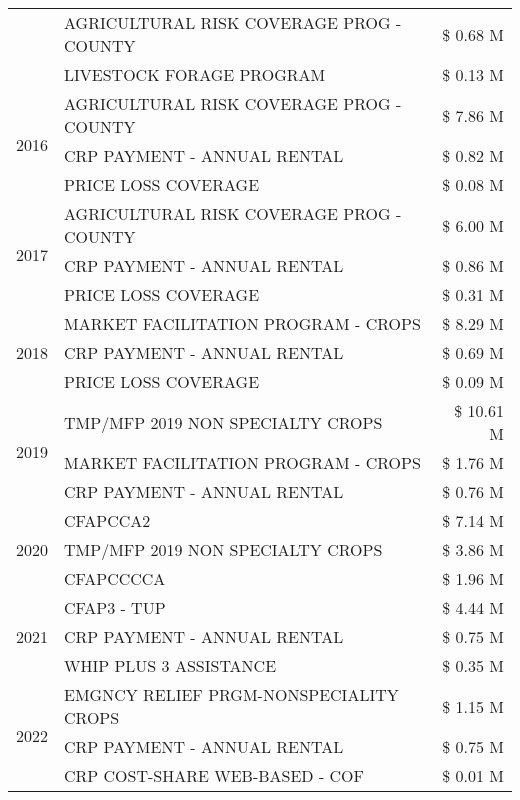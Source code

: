 \begin{tabular}{llr}
 & AGRICULTURAL RISK COVERAGE PROG - COUNTY & \$ 0.68 M \\
 & LIVESTOCK FORAGE PROGRAM & \$ 0.13 M \\
\cline{1-3}
\multirow[t]{3}{*}{2016} & AGRICULTURAL RISK COVERAGE PROG - COUNTY & \$ 7.86 M \\
 & CRP PAYMENT - ANNUAL RENTAL & \$ 0.82 M \\
 & PRICE LOSS COVERAGE & \$ 0.08 M \\
\cline{1-3}
\multirow[t]{3}{*}{2017} & AGRICULTURAL RISK COVERAGE PROG - COUNTY & \$ 6.00 M \\
 & CRP PAYMENT - ANNUAL RENTAL & \$ 0.86 M \\
 & PRICE LOSS COVERAGE & \$ 0.31 M \\
\cline{1-3}
\multirow[t]{3}{*}{2018} & MARKET FACILITATION PROGRAM - CROPS & \$ 8.29 M \\
 & CRP PAYMENT - ANNUAL RENTAL & \$ 0.69 M \\
 & PRICE LOSS COVERAGE & \$ 0.09 M \\
\cline{1-3}
\multirow[t]{3}{*}{2019} & TMP/MFP 2019 NON SPECIALTY CROPS & \$ 10.61 M \\
 & MARKET FACILITATION PROGRAM - CROPS & \$ 1.76 M \\
 & CRP PAYMENT - ANNUAL RENTAL & \$ 0.76 M \\
\cline{1-3}
\multirow[t]{3}{*}{2020} & CFAPCCA2 & \$ 7.14 M \\
 & TMP/MFP 2019 NON SPECIALTY CROPS & \$ 3.86 M \\
 & CFAPCCCCA & \$ 1.96 M \\
\cline{1-3}
\multirow[t]{3}{*}{2021} & CFAP3 - TUP & \$ 4.44 M \\
 & CRP PAYMENT - ANNUAL RENTAL & \$ 0.75 M \\
 & WHIP PLUS 3 ASSISTANCE & \$ 0.35 M \\
\cline{1-3}
\multirow[t]{3}{*}{2022} & EMGNCY RELIEF PRGM-NONSPECIALITY CROPS & \$ 1.15 M \\
 & CRP PAYMENT - ANNUAL RENTAL & \$ 0.75 M \\
 & CRP COST-SHARE WEB-BASED - COF & \$ 0.01 M \\
\cline{1-3}
\bottomrule
\end{tabular}
